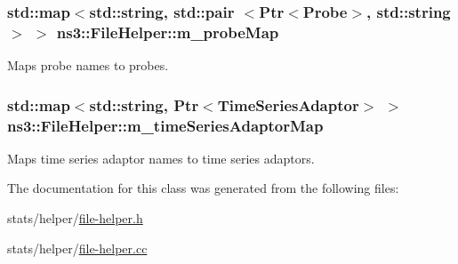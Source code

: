 \subsubsection[{\texorpdfstring{m\+\_\+probe\+Map}{m_probeMap}}]{\setlength{\rightskip}{0pt plus 5cm}std\+::map$<$std\+::string, std\+::pair $<${\bf Ptr}$<${\bf Probe}$>$, std\+::string$>$ $>$ ns3\+::\+File\+Helper\+::m\+\_\+probe\+Map\hspace{0.3cm}{\ttfamily [private]}}\hypertarget{classns3_1_1FileHelper_a69184708162929e89458eed5956791e1}{}\label{classns3_1_1FileHelper_a69184708162929e89458eed5956791e1}


Maps probe names to probes. 

\subsubsection[{\texorpdfstring{m\+\_\+time\+Series\+Adaptor\+Map}{m_timeSeriesAdaptorMap}}]{\setlength{\rightskip}{0pt plus 5cm}std\+::map$<$std\+::string, {\bf Ptr}$<${\bf Time\+Series\+Adaptor}$>$ $>$ ns3\+::\+File\+Helper\+::m\+\_\+time\+Series\+Adaptor\+Map\hspace{0.3cm}{\ttfamily [private]}}\hypertarget{classns3_1_1FileHelper_a2e55bee0c776ab5f14cc2d4dfbfcc361}{}\label{classns3_1_1FileHelper_a2e55bee0c776ab5f14cc2d4dfbfcc361}


Maps time series adaptor names to time series adaptors. 



The documentation for this class was generated from the following files\+:\begin{DoxyCompactItemize}
\item 
stats/helper/\hyperlink{file-helper_8h}{file-\/helper.\+h}\item 
stats/helper/\hyperlink{file-helper_8cc}{file-\/helper.\+cc}\end{DoxyCompactItemize}
